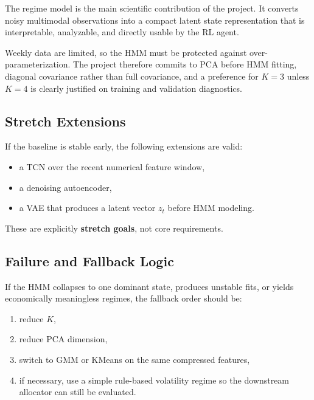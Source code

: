 \documentclass[11pt,a4paper]{article}
\begin{document}
\begin{insightbox}[title=\textbf{Why the Regime Model Matters}]
The regime model is the main scientific contribution of the project.
It converts noisy multimodal observations into a compact latent state representation that is interpretable, analyzable, and directly usable by the RL agent.
\end{insightbox}

\begin{warningbox}[title=\textbf{Parameter-Control Decision}]
Weekly data are limited, so the HMM must be protected against over-parameterization.
The project therefore commits to PCA before HMM fitting, diagonal covariance rather than full covariance, and a preference for $K=3$ unless $K=4$ is clearly justified on training and validation diagnostics.
\end{warningbox}

\subsection{Stretch Extensions}

If the baseline is stable early, the following extensions are valid:

\begin{itemize}[leftmargin=1.4em]
  \item a TCN over the recent numerical feature window,
  \item a denoising autoencoder,
  \item a VAE that produces a latent vector $z_t$ before HMM modeling.
\end{itemize}

These are explicitly \textbf{stretch goals}, not core requirements.

\subsection{Failure and Fallback Logic}

If the HMM collapses to one dominant state, produces unstable fits, or yields economically meaningless regimes, the fallback order should be:

\begin{enumerate}[leftmargin=1.5em]
  \item reduce $K$,
  \item reduce PCA dimension,
  \item switch to GMM or KMeans on the same compressed features,
  \item if necessary, use a simple rule-based volatility regime so the downstream allocator can still be evaluated.
\end{enumerate}
\end{document}
